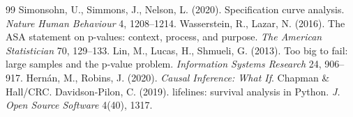 \documentclass[11pt,a4paper]{article}
\begin{document}
\begin{thebibliography}{99}
 Simonsohn, U., Simmons, J., Nelson, L. (2020). Specification curve analysis. \emph{Nature Human Behaviour} 4, 1208--1214.
 Wasserstein, R., Lazar, N. (2016). The ASA statement on p-values: context, process, and purpose. \emph{The American Statistician} 70, 129--133.
 Lin, M., Lucas, H., Shmueli, G. (2013). Too big to fail: large samples and the p-value problem. \emph{Information Systems Research} 24, 906--917.
 Hern\'an, M., Robins, J. (2020). \emph{Causal Inference: What If}. Chapman \& Hall/CRC.
 Davidson-Pilon, C. (2019). lifelines: survival analysis in Python. \emph{J. Open Source Software} 4(40), 1317.
\end{thebibliography}
\end{document}

